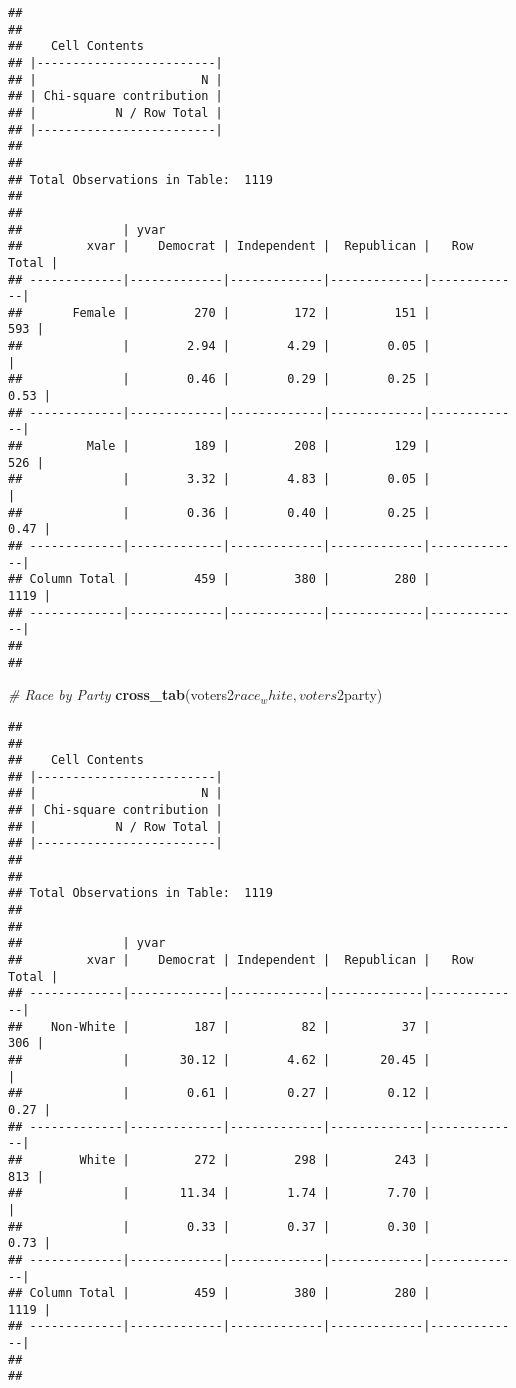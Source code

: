 \documentclass[]{article}
\newenvironment{Shaded}{\begin{snugshade}}{\end{snugshade}}
\newcommand{\KeywordTok}[1]{\textcolor[rgb]{0.13,0.29,0.53}{\textbf{{#1}}}}
\newcommand{\CommentTok}[1]{\textcolor[rgb]{0.56,0.35,0.01}{\textit{{#1}}}}
\newcommand{\NormalTok}[1]{{#1}}
\begin{document}
\begin{verbatim}
## 
##  
##    Cell Contents
## |-------------------------|
## |                       N |
## | Chi-square contribution |
## |           N / Row Total |
## |-------------------------|
## 
##  
## Total Observations in Table:  1119 
## 
##  
##              | yvar 
##         xvar |    Democrat | Independent |  Republican |   Row Total | 
## -------------|-------------|-------------|-------------|-------------|
##       Female |         270 |         172 |         151 |         593 | 
##              |        2.94 |        4.29 |        0.05 |             | 
##              |        0.46 |        0.29 |        0.25 |        0.53 | 
## -------------|-------------|-------------|-------------|-------------|
##         Male |         189 |         208 |         129 |         526 | 
##              |        3.32 |        4.83 |        0.05 |             | 
##              |        0.36 |        0.40 |        0.25 |        0.47 | 
## -------------|-------------|-------------|-------------|-------------|
## Column Total |         459 |         380 |         280 |        1119 | 
## -------------|-------------|-------------|-------------|-------------|
## 
## 
\end{verbatim}

\begin{Shaded}
\begin{Highlighting}[]
\CommentTok{# Race by Party}
\KeywordTok{cross_tab}\NormalTok{(voters2$race_white, voters2$party)}
\end{Highlighting}
\end{Shaded}

\begin{verbatim}
## 
##  
##    Cell Contents
## |-------------------------|
## |                       N |
## | Chi-square contribution |
## |           N / Row Total |
## |-------------------------|
## 
##  
## Total Observations in Table:  1119 
## 
##  
##              | yvar 
##         xvar |    Democrat | Independent |  Republican |   Row Total | 
## -------------|-------------|-------------|-------------|-------------|
##    Non-White |         187 |          82 |          37 |         306 | 
##              |       30.12 |        4.62 |       20.45 |             | 
##              |        0.61 |        0.27 |        0.12 |        0.27 | 
## -------------|-------------|-------------|-------------|-------------|
##        White |         272 |         298 |         243 |         813 | 
##              |       11.34 |        1.74 |        7.70 |             | 
##              |        0.33 |        0.37 |        0.30 |        0.73 | 
## -------------|-------------|-------------|-------------|-------------|
## Column Total |         459 |         380 |         280 |        1119 | 
## -------------|-------------|-------------|-------------|-------------|
## 
## 
\end{verbatim}
\end{document}
